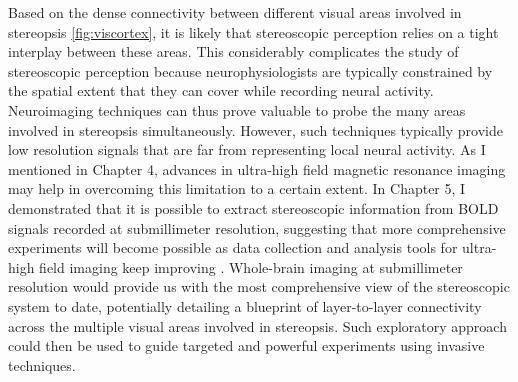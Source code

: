 Based on the dense connectivity between different visual areas involved in stereopsis \ref{fig:viscortex}, it is likely that stereoscopic perception relies on a tight interplay between these areas. This considerably complicates the study of stereoscopic perception because neurophysiologists are typically constrained by the spatial extent that they can cover while recording neural activity. Neuroimaging techniques can thus prove valuable to probe the many areas involved in stereopsis simultaneously. However, such techniques typically provide low resolution signals that are far from representing local neural activity. As I mentioned in Chapter 4, advances in ultra-high field magnetic resonance imaging may help in overcoming this limitation to a certain extent. In Chapter 5, I demonstrated that it is possible to extract stereoscopic information from BOLD signals recorded at submillimeter resolution, suggesting that more comprehensive experiments will become possible as data collection and analysis tools for ultra-high field imaging keep improving \cite{Huber:2015ao,Kok:2016fk}. Whole-brain imaging at submillimeter resolution would provide us with the most comprehensive view of the stereoscopic system to date, potentially detailing a blueprint of layer-to-layer connectivity across the multiple visual areas involved in stereopsis. Such exploratory approach could then be used to guide targeted and powerful experiments using invasive techniques.






